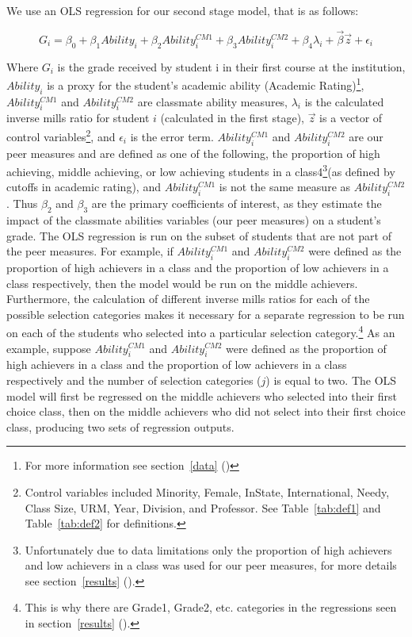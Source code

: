 \documentclass[12pt,a4paper,english,fleqn]{article}
\newcommand{\sectlabel}[1]{section~\ref{#1} (\nameref{#1})}
\newcommand{\tablelabel}[1]{Table~\ref{#1}}
\begin{document}
We use an OLS regression for our second stage model, that is as follows:

\begin{equation}\label{eq:4}
G_{i} = \beta_{0} + \beta_{1} Ability_{i} + \beta_{2} Ability_{i}^{CM1} + \beta_{3} Ability_{i}^{CM2} + \beta_{4} \lambda_{i} + \overrightarrow{\beta} \overrightarrow{z} + \epsilon_{i}
\end{equation}

Where $G_{i}$ is the grade received by student i in their first course at the institution, $Ability_{i}$ is a proxy for the student's academic ability (Academic Rating)\footnote{For more information see \sectlabel{data}}, $Ability_{i}^{CM1}$ and $Ability_{i}^{CM2}$ are classmate ability measures, $\lambda_{i}$ is the calculated inverse mills ratio for student $i$ (calculated in the first stage), $\overrightarrow{z}$ is a vector of control variables\footnote{Control variables included Minority, Female, InState, International, Needy, Class Size, URM, Year, Division, and Professor. See \tablelabel{tab:def1} and \tablelabel{tab:def2} for definitions.}, and $\epsilon_{i}$ is the error term. 
$Ability_{i}^{CM1}$ and $Ability_{i}^{CM2}$ are our peer measures and are defined as one of the following, the proportion of high achieving, middle achieving, or low achieving students in a class4\footnote{Unfortunately due to data limitations only the proportion of high achievers and low achievers in a class was used for our peer measures, for more details see \sectlabel{results}.}(as defined by cutoffs in academic rating), and $Ability_{i}^{CM1}$ is not the same measure as  $Ability_{i}^{CM2}$. 
Thus $\beta_{2}$ and $\beta_{3}$ are the primary coefficients of interest, as they estimate the impact of the classmate abilities variables (our peer measures) on a student's grade. 
The OLS regression is run on the subset of students that are not part of the peer measures. 
For example, if $Ability_{i}^{CM1}$ and $Ability_{i}^{CM2}$ were defined as the proportion of high achievers in a class and the proportion of low achievers in a class respectively, then the model would be run on the middle achievers. 
Furthermore, the calculation of different inverse mills ratios for each of the possible selection categories makes it necessary for a separate regression to be run on each of the students who selected into a particular selection category.\footnote{This is why there are Grade1, Grade2, etc. categories in the regressions seen in \sectlabel{results}.}
As an example, suppose $Ability_{i}^{CM1}$ and $Ability_{i}^{CM2}$ were defined as the proportion of high achievers in a class and the proportion of low achievers in a class respectively and the number of selection categories ($j$) is equal to two. 
The OLS model will first be regressed on the middle achievers who selected into their first choice class, then on the middle achievers who did not select into their first choice class, producing two sets of regression outputs. 
\end{document}
